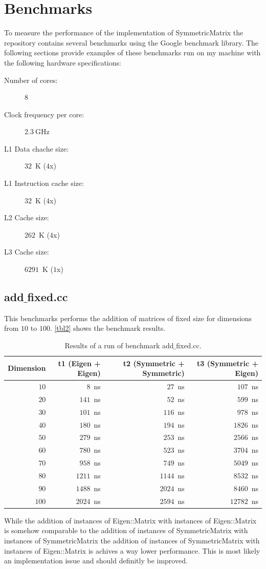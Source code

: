 \documentclass[a4wide]{scrartcl}
\begin{document}
\section{Benchmarks}
To measure the performance of the implementation of SymmetricMatrix the repository contains several benchmarks using the Google benchmark library. The following sections provide examples of these benchmarks run on my machine with the following hardware specifications:
\begin{description}
\item[Number of cores:]$8$
\item[Clock frequency per core:]$2.3~$GHz
\item[L1 Data chache size:]$32$~K ($4$x)
\item[L1 Instruction cache size:]$32$~K ($4$x)
\item[L2 Cache size:]$262$~K ($4$x)
\item[L3 Cache size:]$6291$~K ($1$x)
\end{description}

\subsection{add$\_$fixed.cc}
This benchmarks performs the addition of matrices of fixed size for dimensions from $10$ to $100$. \autoref{tbl2} shows the benchmark results.
\begin{table}
    \centering
\begin{tabular}{r|r|r|r}
    Dimension & t1 (Eigen + Eigen)  & t2 (Symmetric + Symmetric) & t3 (Symmetric + Eigen)  \\ \hline \hline
    $10$  & $8$~ns & $27$~ns & $107$~ns\\
    $20$  & $141$~ns & $52$~ns & $599$~ns\\
    $30$  & $101$~ns & $116$~ns & $978$~ns\\
    $40$  & $180$~ns & $194$~ns & $1826$~ns\\
    $50$  & $279$~ns & $253$~ns & $2566$~ns\\
    $60$  & $780$~ns & $523$~ns & $3704$~ns\\
    $70$  & $958$~ns & $749$~ns & $5049$~ns \\
    $80$  & $1211$~ns & $1144$~ns & $8532$~ns \\
    $90$  & $1488$~ns & $2024$~ns & $8460$~ns\\
    $100$ & $2024$~ns & $2594$~ns & $12782$~ns
    \end{tabular}
    \caption{Results of a run of benchmark add$\_$fixed.cc.}
    \label{tbl2}
\end{table}
While the addition of instances of Eigen::Matrix with instances of Eigen::Matrix is somehow comparable to the addition of instances of SymmetricMatrix with instances of SymmetricMatrix the addition of instances of SymmetricMatrix with instances of Eigen::Matrix is achives a way lower performance. This is most likely an implementation issue and should definitly be improved.
\end{document}
